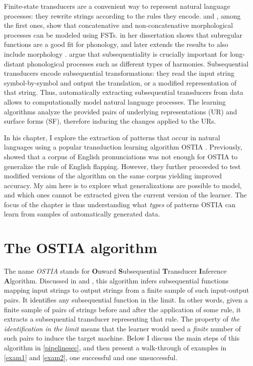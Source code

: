 Finite-state transducers are a convenient way to represent natural language processes: they rewrite strings according to the rules they encode.
\cite{Koskenniemi1983} and \cite{Kiraz1996}, among the first ones, show that concatenative and non-concatenative morphological processes can be modeled using FSTs.
\cite{Chandlee2014} in her dissertation shows that subregular functions are a good fit for phonology, and later extends the results to also include morphology \citep{Chandlee2017}.
\cite{Heinz-Lai-2013-VHS} argue that subsequentiality is crucially important for long-distant phonological processes such as different types of harmonies.
Subsequential transducers encode subsequential transformations: they read the input string symbol-by-symbol and output the translation, or a modified representation of that string.
Thus, automatically extracting subsequential transducers from data allows to computationally model natural language processes.
The learning algorithms analyze the provided pairs of underlying representations (UR) and surface forms (SF), therefore inducing the changes applied to the URs.

In his chapter, I explore the extraction of patterns that occur in natural languages using a popular transduction learning algorithm OSTIA \citep{OncinaEtAl1993}.
Previously, \cite{GildeaJurafsky1996} showed that a corpus of English pronunciations was not enough for OSTIA to generalize the rule of English flapping.
However, they further proceeded to test modified versions of the algorithm on the same corpus yielding improved accuracy.
My aim here is to explore what generalizations are possible to model, and which ones cannot be extracted given the current version of the learner.
The focus of the chapter is thus understanding what \emph{types} of patterns OSTIA can learn from samples of automatically generated data.


\section{The OSTIA algorithm}

The name \emph{OSTIA} stands for \textbf{O}nward  \textbf{S}ubsequential \textbf{T}ransducer \textbf{I}nference \textbf{A}lgorithm.
Discussed in \cite{OncinaEtAl1993} and \cite{DeLaHiguera2010}, this algorithm infers subsequential functions mapping input strings to output strings from a finite sample of such input-output pairs.
It identifies any subsequential function in the limit.
In other words, given a finite sample of pairs of strings before and after the application of some rule, it extracts a subsequential transducer representing that rule.
The property of \emph{the identification in the limit} means that the learner would need a \emph{finite} number of such pairs to induce the target machine.
Below I discuss the main steps of this algorithm in \ref{pipelinesec}, and then present a walk-through of examples in \ref{exam1} and \ref{exam2}, one successful and one unsuccessful.

